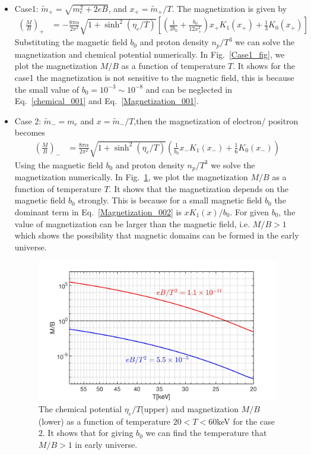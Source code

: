 \documentclass[Universe,article,submit,moreauthors,pdftex]{Definitions/mdpi}
\newcommand*{\req}[1]{Eq.~{\eqref{#1}}}
\newcommand*{\rf}[1]{Fig.~{\ref{#1}}}
\begin{document}
\begin{itemize}
  \item Case1: $\tilde m_+=\sqrt{m^2_e+2eB}$, and $x_+=\tilde m_+/T$. The magnetization is given by
  \begin{align}\label{Magnetization_001}
 \left(\frac{M}{B}\right)_+&=-\frac{8\pi\alpha}{2\pi^2}\sqrt{1+\sinh^2(\eta_e/T)}\left[\left(\frac{1}{2b_0}+\frac{b_0}{12x_+^2}\right)x_+K_1(x_+)+\frac{1}{3}K_0(x_+)\right]
   \end{align}
Substituting the magnetic field $b_0$ and proton density $n_p/T^3$  we can solve the magnetization and chemical potential numerically. In \rf{Case1_fig}, we plot the  magnetization $M/B$ as a function of temperature $T$. It shows for the case1 the magnetization is not sensitive to the magnetic field, this is because the small value of $b_0=10^{-3}\sim10^{-8}$ and can be neglected in \req{chemical_001} and \req{Magnetization_001}.
\\
  \item Case 2: $\tilde m_-=m_e$ and $x=\tilde m_-/T$,then the magnetization of electron/ positron becomes
\begin{align}\label{Magnetization_002}
\left(\frac{M}{B}\right)_-&=\frac{8\pi\alpha}{2\pi^2}\sqrt{1+\sinh^2(\eta_e/T)}\left(\frac{1}{b_0}x_-K_1(x_-)+\frac{1}{6}K_0(x_-)\right)
\end{align}
Using the magnetic field $b_0$ and proton density $n_p/T^3$ we solve the magnetization  numerically. In \rf{Case2_fig}, we plot the  magnetization $M/B$ as a function of temperature $T$. It shows that the magnetization depends on the magnetic field $b_0$ strongly. This is because for a small magnetic field $b_0$ the dominant term in \req{Magnetization_002} is $xK_1(x)/b_0$. For given $b_0$, the value of magnetization can be larger than the magnetic field, i.e. $M/B>1$  which shows the possibility that magnetic domains can be formed in the early universe.

\begin{figure}[h]
\centering
\includegraphics[width=0.75\linewidth]{Magnetization_Final.jpg}
\caption{The chemical potential $\eta_{e}/T$(upper) and magnetization $M/B$(lower) as a function of temperature $20<T<60$keV  for the case 2.  It shows that for giving $b_0$ we can find the temperature that $M/B>1$ in early universe.}
\label{Case2_fig} 
\end{figure}

\end{itemize}
\end{document}
